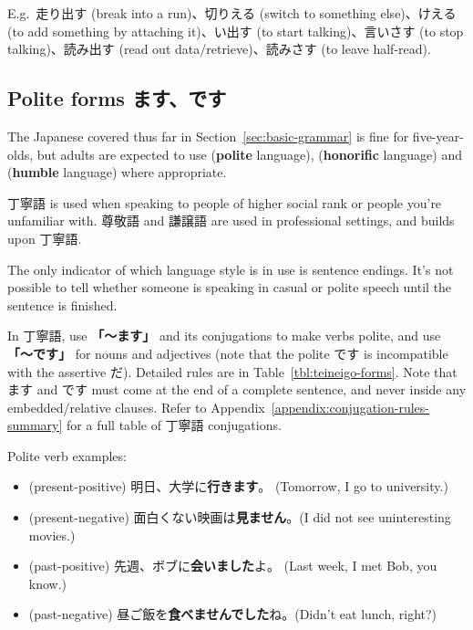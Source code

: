 \documentclass[../nihongo-gakushuu-kyouzai-grammar.tex]{subfiles}
\begin{document}
E.g.\ 走り出す (break into a run)、切りえる (switch to something else)、けえる (to add something by attaching it)、い出す (to start talking)、言いさす (to stop talking)、読み出す (read out data/retrieve)、読みさす (to leave half-read).


\subsection{Polite forms ます、です}

The Japanese covered thus far in Section~\ref{sec:basic-grammar} is fine for five-year-olds, but adults are expected to use  (\textbf{polite} language),  (\textbf{honorific} language) and  (\textbf{humble} language) where appropriate.

丁寧語 is used when speaking to people of higher social rank or people you're unfamiliar with. 尊敬語 and 謙譲語 are used in professional settings, and builds upon 丁寧語.

The only indicator of which language style is in use is sentence endings. It's not possible to tell whether someone is speaking in casual or polite speech until the sentence is finished.

In 丁寧語, use \textbf{「〜ます」} and its conjugations to make verbs polite, and use \textbf{「〜です」} for nouns and adjectives (note that the polite です is incompatible with the assertive だ). Detailed rules are in Table~\ref{tbl:teineigo-forms}. Note that ます and です must come at the end of a complete sentence, and never inside any embedded/relative clauses. Refer to Appendix~\ref{appendix:conjugation-rules-summary} for a full table of 丁寧語 conjugations.

Polite verb examples:
\begin{itemize}
    \item (present-positive) 明日、大学に\textbf{行きます}。 (Tomorrow, I go to university.)
    \item (present-negative) 面白くない映画は\textbf{見ません}。(I did not see uninteresting movies.)
    \item (past-positive) 先週、ボブに\textbf{会いました}よ。 (Last week, I met Bob, you know.)
    \item (past-negative) 昼ご飯を\textbf{食べませんでした}ね。(Didn't eat lunch, right?)
\end{itemize}
\end{document}
